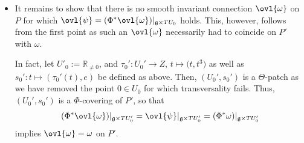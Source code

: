 \documentclass[pdftex]{sigma}
\numberwithin{equation}{section}
\begin{document}
\begin{Example}
\begin{enumerate}
\begin{itemize}
    \begin{align*}
      \ovl{\psi}_{t}(\lambda\hspace{1pt} \vec{e}_1,r)
&= (\Phi^*\omega)_{(e,s_0(t))}(\lambda\vec{e}_1,\mathrm{d}_t s_0(r))
      =\big(\Phi^*\omega\big)\left(\lambda\hspace{1pt} \vec{e}_1,r\cdot \vec{e}_1 + 3t^2 r\cdot \vec{e}_2\right)\\
      &=\omega_{((t,t^3),e)}\big((\lambda+r)\cdot \vec{e}_1 + 3t^2 r\cdot \vec{e}_2,\vec{0}_{\mathfrak{s}}\big)\\
      &=\psi_{t^3}\!\left(\left(\lambda+r\right)\cdot \vec{e}_1,3t^2 r\cdot \vec{e}_2\right)= 3 t r\cdot \vec{s}
    \end{align*}
    as well as $\ovl{\psi}_{0}(\lambda\hspace{1pt} \vec{e}_1,r)=0$ if $t=0$. For the first step, keep in mind that
	\begin{align*}
    (\Phi^*\omega)|_{\mathfrak{g}\times T_tU_0}(\vec{g},r)=(\Phi^*\omega)(\vec{g},\mathrm{d}_t s_0(r))
    \end{align*}
    holds by Convention \ref{conv:Submnfds}.2. Since $\omega$ fulfils the algebraic properties of an invariant connection, $\ovl{\psi}$ fulfils the algebraical properties from Example \ref{example:SCHSV}.
    \item
    It remains to show that there is no smooth invariant connection $\ovl{\omega}$ on $P$ for which $\ovl{\psi}=(\Phi^*\ovl{\omega})|_{\mathfrak{g}\times TU_0}$ holds. This, however, follows from the first point as such an $\ovl{\omega}$ necessarily had to coincide  on $P'$ with $\omega$.

    In fact, let $U'_0:=\mathbb{R}_{\neq 0}$, and $\tau_0'\colon U_0'\rightarrow Z$, $t\mapsto \big(t,t^3\big)$ as well as $s_0'\colon t\mapsto(\tau_0'(t),e)$ be defined as above. Then, $(U_0',s_0')$ is a $\Theta$-patch as we have removed the point $0\in U_0$ for which transversality fails. Thus, $(U_0',s_0')$ is a $\Phi$-covering of $P'$, so that
    \begin{gather*}
    	(\Phi^*\ovl{\omega})|_{\mathfrak{g}\times T U'_0}=\ovl{\psi}|_{\mathfrak{g}\times T U'_0}=(\Phi^*\omega)|_{\mathfrak{g}\times T U'_0}
    \end{gather*}
    implies $\ovl{\omega}=\omega$ on $P'$.
\end{itemize}
\endgroup


\end{enumerate}
\end{Example}
\end{document}
